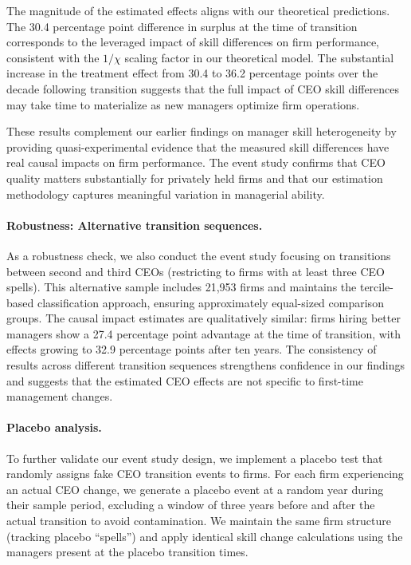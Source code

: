 \documentclass[11pt,a4paper]{article}
\begin{document}
The magnitude of the estimated effects aligns with our theoretical predictions. The 30.4 percentage point difference in surplus at the time of transition corresponds to the leveraged impact of skill differences on firm performance, consistent with the $1/\chi$ scaling factor in our theoretical model. The substantial increase in the treatment effect from 30.4 to 36.2 percentage points over the decade following transition suggests that the full impact of CEO skill differences may take time to materialize as new managers optimize firm operations.

These results complement our earlier findings on manager skill heterogeneity by providing quasi-experimental evidence that the measured skill differences have real causal impacts on firm performance. The event study confirms that CEO quality matters substantially for privately held firms and that our estimation methodology captures meaningful variation in managerial ability.

\paragraph{Robustness: Alternative transition sequences.} As a robustness check, we also conduct the event study focusing on transitions between second and third CEOs (restricting to firms with at least three CEO spells). This alternative sample includes 21,953 firms and maintains the tercile-based classification approach, ensuring approximately equal-sized comparison groups. The causal impact estimates are qualitatively similar: firms hiring better managers show a 27.4 percentage point advantage at the time of transition, with effects growing to 32.9 percentage points after ten years. The consistency of results across different transition sequences strengthens confidence in our findings and suggests that the estimated CEO effects are not specific to first-time management changes.

\paragraph{Placebo analysis.} To further validate our event study design, we implement a placebo test that randomly assigns fake CEO transition events to firms. For each firm experiencing an actual CEO change, we generate a placebo event at a random year during their sample period, excluding a window of three years before and after the actual transition to avoid contamination. We maintain the same firm structure (tracking placebo ``spells'') and apply identical skill change calculations using the managers present at the placebo transition times.
\end{document}
